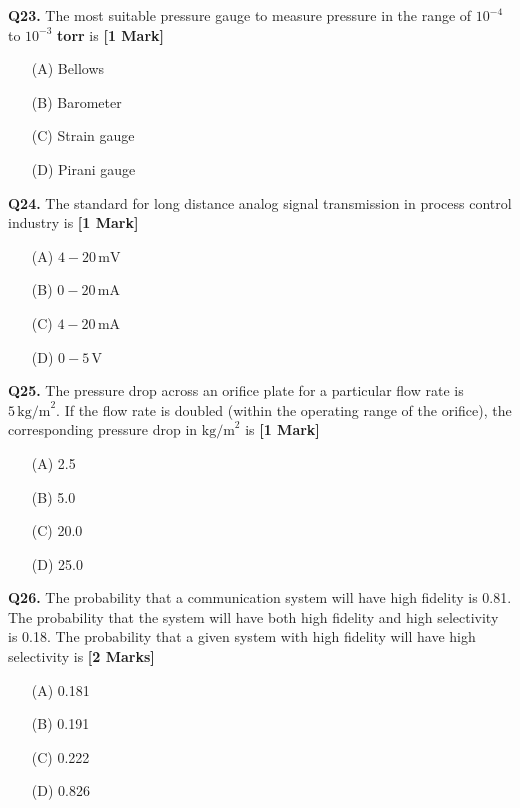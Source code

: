 \documentclass[11pt]{article}
\newcommand{\questiona}[2]{
    \noindent\textbf{Q#2.} #1 \hfill \textbf{[1 Mark]}
}
\newcommand{\questionb}[2]{
    \noindent\textbf{Q#2.} #1 \hfill \textbf{[2 Marks]}
}
\begin{document}
\questiona{The most suitable pressure gauge to measure pressure in the range of \(10^{-4}\) to \(10^{-3}\) \textbf{torr} is}{23}
\begin{enumerate}
    \item[(A)] Bellows  
    \item[(B)] Barometer  
    \item[(C)] Strain gauge  
    \item[(D)] Pirani gauge  
\end{enumerate}
\vspace{0.5cm}

\questiona{The standard for long distance analog signal transmission in process control industry is}{24}
\begin{enumerate}
    \item[(A)] \(4 - 20 \, \text{mV}\)  
    \item[(B)] \(0 - 20 \, \text{mA}\)  
    \item[(C)] \(4 - 20 \, \text{mA}\)  
    \item[(D)] \(0 - 5 \, \text{V}\)  
\end{enumerate}
\vspace{0.5cm}

\questiona{The pressure drop across an orifice plate for a particular flow rate is \(5 \, \text{kg/m}^2\). If the flow rate is doubled (within the operating range of the orifice), the corresponding pressure drop in \(\text{kg/m}^2\) is}{25}
\begin{enumerate}
    \item[(A)] 2.5  
    \item[(B)] 5.0  
    \item[(C)] 20.0  
    \item[(D)] 25.0  
\end{enumerate}
\vspace{0.5cm}

\questionb{The probability that a communication system will have high fidelity is 0.81. The probability that the system will have both high fidelity and high selectivity is 0.18. The probability that a given system with high fidelity will have high selectivity is}{26}
\begin{enumerate}
    \item[(A)] 0.181  
    \item[(B)] 0.191  
    \item[(C)] 0.222  
    \item[(D)] 0.826  
\end{enumerate}
\vspace{0.5cm}
\end{document}
